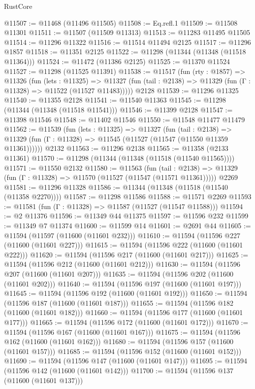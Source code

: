 \begin{lexlean}{RustCore}
\begin{coremodule}
@11507 := @11468 (@11496 @11505)
@11508 := Eq.refl.{1}
@11509 := @11508 @11301
@11511 := @11507 (@11509 @11313)
@11513 := @11283 @11495 @11505
@11514 := @11296 @11322
@11516 := @11514 @11494 @2125
@11517 := @11296 @1857
@11518 := @11351 @2125
@11522 := @11298 (@11344 (@11348 (@11518 @11364)))
@11524 := @11472 (@11386 @2125)
@11525 := @11370 @11524
@11527 := @11298 (@11525 @11391)
@11538 := @11517
    (fun (rty : @1857) =>
    @11326
      (fun (lets : @11325) =>
      @11327 (fun (tail : @2138) => @11329 (fun (Γ : @11328) => @11522 (@11527 @11483)))))
    @2128
@11539 := @11296 @11325
@11540 := @11355 @2128
@11541 := @11540 @11363
@11545 := @11298 (@11344 (@11348 (@11518 @11541)))
@11546 := @11399 @2128
@11547 := @11398 @11546
@11548 := @11402 @11546
@11550 := @11548 @11477 @11479
@11562 := @11539
    (fun (lets : @11325) =>
    @11327
      (fun (tail : @2138) =>
      @11329 (fun (Γ : @11328) => @11545 (@11527 (@11547 (@11550 @11359 @11361))))))
    @2132
@11563 := @11296 @2138
@11565 := @11358 (@2133 @11361)
@11570 := @11298 (@11344 (@11348 (@11518 (@11540 @11565))))
@11571 := @11550 @2132
@11580 := @11563
    (fun (tail : @2138) => @11329 (fun (Γ : @11328) => @11570 (@11527 (@11547 (@11571 @11361)))))
    @2269
@11581 := @11296 @11328
@11586 := @11344 (@11348 (@11518 (@11540 (@11358 @2270))))
@11587 := @11298 @11586
@11588 := @11571 @2269
@11593 := @11581 (fun (Γ : @11328) => @11587 (@11527 (@11547 @11588)))
@11594 := @2 @11376
@11596 := @11349 @44 @11375
@11597 := @11596 @232
@11599 := @11349 @7 @11374
@11600 := @11599 @14
@11601 := @2691 @44
@11605 := @11594 (@11597 (@11600 (@11601 @232)))
@11610 := @11594 (@11596 @227 (@11600 (@11601 @227)))
@11615 := @11594 (@11596 @222 (@11600 (@11601 @222)))
@11620 := @11594 (@11596 @217 (@11600 (@11601 @217)))
@11625 := @11594 (@11596 @212 (@11600 (@11601 @212)))
@11630 := @11594 (@11596 @207 (@11600 (@11601 @207)))
@11635 := @11594 (@11596 @202 (@11600 (@11601 @202)))
@11640 := @11594 (@11596 @197 (@11600 (@11601 @197)))
@11645 := @11594 (@11596 @192 (@11600 (@11601 @192)))
@11650 := @11594 (@11596 @187 (@11600 (@11601 @187)))
@11655 := @11594 (@11596 @182 (@11600 (@11601 @182)))
@11660 := @11594 (@11596 @177 (@11600 (@11601 @177)))
@11665 := @11594 (@11596 @172 (@11600 (@11601 @172)))
@11670 := @11594 (@11596 @167 (@11600 (@11601 @167)))
@11675 := @11594 (@11596 @162 (@11600 (@11601 @162)))
@11680 := @11594 (@11596 @157 (@11600 (@11601 @157)))
@11685 := @11594 (@11596 @152 (@11600 (@11601 @152)))
@11690 := @11594 (@11596 @147 (@11600 (@11601 @147)))
@11695 := @11594 (@11596 @142 (@11600 (@11601 @142)))
@11700 := @11594 (@11596 @137 (@11600 (@11601 @137)))

\end{coremodule}
\end{lexlean}
